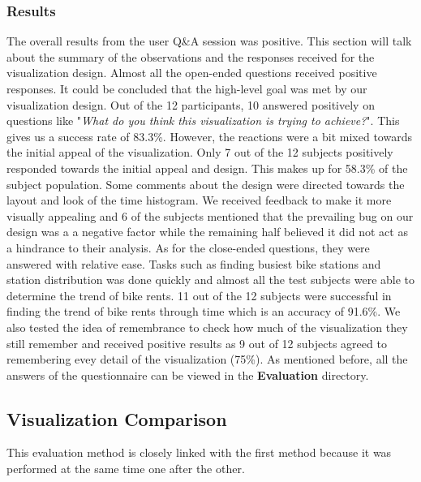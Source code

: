 \subsubsection{Results}
The overall results from the user Q\&A session was positive. This section will talk about the summary of the observations and the responses received for the visualization design.\newline
Almost all the open-ended questions received positive responses. It could be concluded that the high-level goal was met by our visualization design. Out of the 12 participants, 10 answered positively on questions like "\textit{What do you think this visualization is trying to achieve?}". This gives us a success rate of 83.3\%. However, the reactions were a bit mixed towards the initial appeal of the visualization. Only 7 out of the 12 subjects positively responded towards the initial appeal and design. This makes up for 58.3\% of the subject population.\newline
Some comments about the design were directed towards the layout and look of the time histogram. We received feedback to make it more visually appealing and 6 of the subjects mentioned that the prevailing bug on our design was a a negative factor while the remaining half believed it did not act as a hindrance to their analysis.\newline
As for the close-ended questions, they were answered with relative ease. Tasks such as finding busiest bike stations and station distribution was done quickly and almost all the test subjects were able to determine the trend of bike rents. 11 out of the 12 subjects were successful in finding the trend of bike rents through time which is an accuracy of 91.6\%. We also tested the idea of remembrance to check how much of the visualization they still remember and received positive results as 9 out of 12 subjects agreed to remembering evey detail of the visualization (75\%).\newline
As mentioned before, all the answers of the questionnaire can be viewed in the \textbf{Evaluation} directory.
\subsection{Visualization Comparison}

This evaluation method is closely linked with the first method because it was performed at the same time one after the other. 
